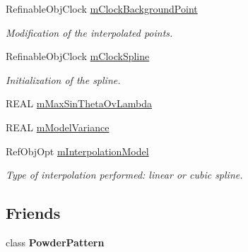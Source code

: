 \begin{DoxyCompactItemize}
\item 
\mbox{\label{class_obj_cryst_1_1_powder_pattern_background_ae26867d298bf99ee07d196b5636a144f}} 
Refinable\+Obj\+Clock \mbox{\hyperlink{class_obj_cryst_1_1_powder_pattern_background_ae26867d298bf99ee07d196b5636a144f}{m\+Clock\+Background\+Point}}
\begin{DoxyCompactList}\small\item\em Modification of the interpolated points. \end{DoxyCompactList}\item 
\mbox{\label{class_obj_cryst_1_1_powder_pattern_background_af2988bbeae93a4ebe62161bfb136a859}} 
Refinable\+Obj\+Clock \mbox{\hyperlink{class_obj_cryst_1_1_powder_pattern_background_af2988bbeae93a4ebe62161bfb136a859}{m\+Clock\+Spline}}
\begin{DoxyCompactList}\small\item\em Initialization of the spline. \end{DoxyCompactList}\item 
R\+E\+AL \mbox{\hyperlink{class_obj_cryst_1_1_powder_pattern_background_aca05bc94a86a737d8b744704478c2c24}{m\+Max\+Sin\+Theta\+Ov\+Lambda}}
\item 
R\+E\+AL \mbox{\hyperlink{class_obj_cryst_1_1_powder_pattern_background_afb62b2f85e9bab627f14265830d1ff09}{m\+Model\+Variance}}
\item 
\mbox{\label{class_obj_cryst_1_1_powder_pattern_background_a8dcbfb135b47ce820d7a6500818c84fd}} 
Ref\+Obj\+Opt \mbox{\hyperlink{class_obj_cryst_1_1_powder_pattern_background_a8dcbfb135b47ce820d7a6500818c84fd}{m\+Interpolation\+Model}}
\begin{DoxyCompactList}\small\item\em Type of interpolation performed\+: linear or cubic spline. \end{DoxyCompactList}\end{DoxyCompactItemize}
\subsection*{Friends}
\begin{DoxyCompactItemize}
\item 
\mbox{\label{class_obj_cryst_1_1_powder_pattern_background_a7b7565a5c419f2d4753446ff094a44cb}} 
class {\bfseries Powder\+Pattern}
\end{DoxyCompactItemize}


